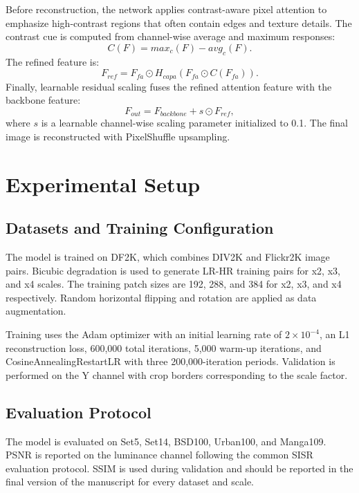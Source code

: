 \documentclass[conference]{IEEEtran}
\begin{document}
Before reconstruction, the network applies contrast-aware pixel attention to emphasize high-contrast regions that often contain edges and texture details. The contrast cue is computed from channel-wise average and maximum responses:
\begin{equation}
C(F) = max_c(F) - avg_c(F).
\end{equation}
The refined feature is:
\begin{equation}
F_{ref} = F_{fa} \odot H_{capa}(F_{fa} \odot C(F_{fa})).
\end{equation}
Finally, learnable residual scaling fuses the refined attention feature with the backbone feature:
\begin{equation}
F_{out} = F_{backbone} + s \odot F_{ref},
\end{equation}
where $s$ is a learnable channel-wise scaling parameter initialized to 0.1. The final image is reconstructed with PixelShuffle upsampling.

\section{Experimental Setup}

\subsection{Datasets and Training Configuration}

The model is trained on DF2K, which combines DIV2K and Flickr2K image pairs. Bicubic degradation is used to generate LR-HR training pairs for x2, x3, and x4 scales. The training patch sizes are 192, 288, and 384 for x2, x3, and x4 respectively. Random horizontal flipping and rotation are applied as data augmentation.

Training uses the Adam optimizer with an initial learning rate of $2 \times 10^{-4}$, an L1 reconstruction loss, 600,000 total iterations, 5,000 warm-up iterations, and CosineAnnealingRestartLR with three 200,000-iteration periods. Validation is performed on the Y channel with crop borders corresponding to the scale factor.

\subsection{Evaluation Protocol}

The model is evaluated on Set5, Set14, BSD100, Urban100, and Manga109. PSNR is reported on the luminance channel following the common SISR evaluation protocol. SSIM is used during validation and should be reported in the final version of the manuscript for every dataset and scale.
\end{document}
